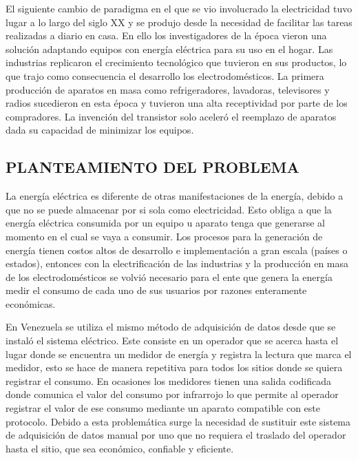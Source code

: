 \documentclass[12pt,letterpaper]{article}
\begin{document}
El siguiente cambio de paradigma en el que se vio involucrado la electricidad tuvo lugar a lo largo del siglo XX y se produjo desde la necesidad de facilitar las tareas realizadas a diario en casa. En ello los investigadores de la época vieron una solución adaptando equipos con energía eléctrica para su uso en el hogar. Las industrias replicaron el crecimiento tecnológico que tuvieron en sus productos, lo que trajo como consecuencia el desarrollo los electrodomésticos. La primera producción de aparatos en masa como refrigeradores, lavadoras, televisores y radios sucedieron en esta época y tuvieron una alta receptividad por parte de los compradores. La invención del transistor solo aceleró el reemplazo de aparatos dada su capacidad de minimizar los equipos.

\newpage

		
\begin{center}
		\section*{ PLANTEAMIENTO DEL PROBLEMA}

\end{center}


\vspace{0.3cm}

La energía eléctrica es diferente de otras manifestaciones de la energía, debido a que no se puede almacenar por si sola como electricidad. Esto obliga a que la energía eléctrica consumida por un equipo u aparato tenga que generarse al momento en el cual se vaya a consumir. Los procesos para la generación de energía tienen costos altos de desarrollo e implementación a gran escala (países o estados), entonces con la electrificación de las industrias y la producción en masa de los electrodomésticos se volvió necesario para el ente que genera la energía medir el consumo de cada uno de sus usuarios por razones enteramente económicas.

En Venezuela se utiliza el mismo método de adquisición de datos desde que se instaló el sistema eléctrico. Este consiste en un operador que se acerca hasta el lugar donde se encuentra un medidor de energía y registra la lectura que marca el medidor, esto se hace de manera repetitiva para todos los sitios donde se quiera registrar el consumo. En ocasiones los medidores tienen una salida codificada donde comunica el valor del consumo por infrarrojo lo que permite al operador registrar el valor de ese consumo mediante un aparato compatible con este protocolo. Debido a esta problemática surge la necesidad de sustituir este sistema de adquisición de datos manual por uno que no requiera el traslado del operador hasta el sitio, que sea económico, confiable y eficiente.
\end{document}
